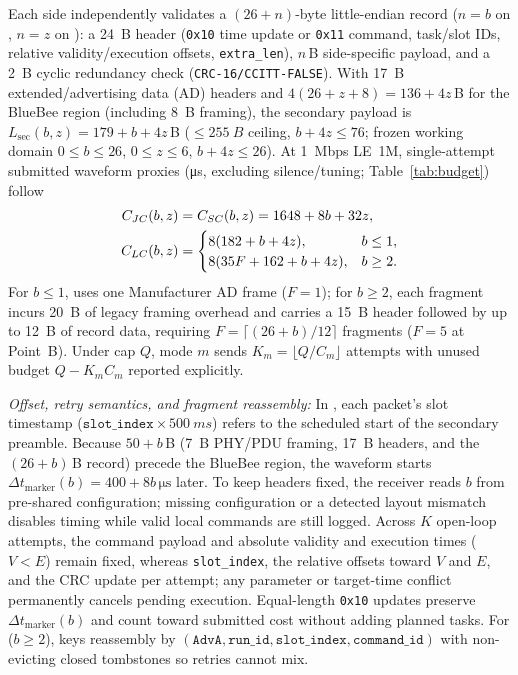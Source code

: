 Each side independently validates a $(26{+}n)$-byte little-endian \proto{} record ($n{=}b$ on \ble{}, $n{=}z$ on \stdfour{}): a \SI{24}{B} header (\texttt{0x10} time update or \texttt{0x11} command, task/slot IDs, relative validity/execution offsets, \texttt{extra\_len}), $n$\,B side-specific payload, and a \SI{2}{B} cyclic redundancy check (\texttt{CRC-16/CCITT-FALSE}). With \SI{17}{B} extended/advertising data (AD) headers and $4(26{+}z{+}8){=}136{+}4z$\,B for the BlueBee region (including \SI{8}{B} \stdfour{} framing), the \modejc{} secondary payload is $L_{\text{sec}}(b,z){=}179{+}b{+}4z$\,B ($\le\SI{255}{B}$ ceiling, $b{+}4z\le 76$; frozen working domain $0\le b\le 26$, $0\le z\le 6$, $b{+}4z\le 26$). At \SI{1}{Mbps} LE~1M, single-attempt submitted waveform proxies (\si{\micro\second}, excluding silence/tuning; Table~\ref{tab:budget}) follow
\begin{align}
  C_{JC}(b,z) &= C_{SC}(b,z) = 1648 + 8b + 32z,\label{eq:cost_jc_sc}\\
  C_{LC}(b,z) &=
  \begin{cases}
    8(182 + b + 4z), & b \le 1,\\
    8(35F + 162 + b + 4z), & b \ge 2.
  \end{cases}\label{eq:cost_lc}
\end{align}
For $b\le 1$, \modelc{} uses one Manufacturer AD frame ($F{=}1$); for $b\ge 2$, each fragment incurs \SI{20}{B} of legacy framing overhead and carries a \SI{15}{B} \fragproto{} header followed by up to \SI{12}{B} of record data, requiring $F{=}\lceil(26{+}b)/12\rceil$ fragments ($F{=}5$ at Point~B). Under cap $Q$, mode $m$ sends $K_m{=}\lfloor Q/C_m\rfloor$ attempts with unused budget $Q{-}K_m C_m$ reported explicitly.



\emph{Offset, retry semantics, and fragment reassembly:} In \modejc{}, each packet's slot timestamp ($\texttt{slot\_index}\times\SI{500}{ms}$) refers to the scheduled start of the secondary \ble{} preamble. Because $50{+}b$\,B (\SI{7}{B} PHY/PDU framing, \SI{17}{B} headers, and the $(26{+}b)$\,B \ble{} record) precede the BlueBee region, the \stdfour{} waveform starts $\Delta t_{\text{marker}}(b){=}400{+}8b\,\si{\micro\second}$ later. To keep headers fixed, the \stdfour{} receiver reads $b$ from pre-shared configuration; missing configuration or a detected layout mismatch disables timing while valid local commands are still logged. Across $K$ open-loop attempts, the command payload and absolute validity and execution times ($V < E$) remain fixed, whereas \texttt{slot\_index}, the relative offsets toward $V$ and $E$, and the CRC update per attempt; any parameter or target-time conflict permanently cancels pending execution. Equal-length \texttt{0x10} updates preserve $\Delta t_{\text{marker}}(b)$ and count toward submitted cost without adding planned tasks. For \modelc{} ($b\ge 2$), \fragproto{} keys reassembly by $(\texttt{AdvA},\allowbreak\texttt{run\_id},\allowbreak\texttt{slot\_index},\allowbreak\texttt{command\_id})$ with non-evicting closed tombstones so retries cannot mix.
